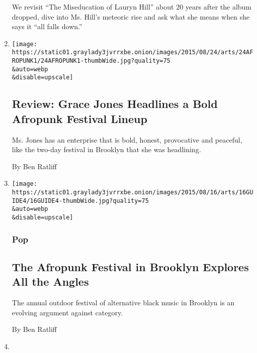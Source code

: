 \begin{enumerate}
  We revisit ``The Miseducation of Lauryn Hill'' about 20 years after
  the album dropped, dive into Ms. Hill's meteoric rise and ask what she
  means when she says it ``all falls down.''
\item
  \href{/2015/08/24/arts/music/review-grace-jones-headlines-a-bold-afropunk-festival-lineup.html}{}

  \texttt{[image: https://static01.graylady3jvrrxbe.onion/images/2015/08/24/arts/24AFROPUNK1/24AFROPUNK1-thumbWide.jpg?quality=75\\\&auto=webp\\\&disable=upscale]}

  \hypertarget{review-grace-jones-headlines-a-bold-afropunk-festival-lineup}{%
  \subsection{Review: Grace Jones Headlines a Bold Afropunk Festival
  Lineup}\label{review-grace-jones-headlines-a-bold-afropunk-festival-lineup}}

  Ms. Jones has an enterprise that is bold, honest, provocative and
  peaceful, like the two-day festival in Brooklyn that she was
  headlining.

  By Ben Ratliff
\item
  \href{/2015/08/16/arts/music/the-afropunk-festival-in-brooklyn-explores-all-the-angles.html}{}

  \texttt{[image: https://static01.graylady3jvrrxbe.onion/images/2015/08/16/arts/16GUIDE4/16GUIDE4-thumbWide.jpg?quality=75\\\&auto=webp\\\&disable=upscale]}

  \hypertarget{pop}{%
  \subsubsection{Pop}\label{pop}}

  \hypertarget{the-afropunk-festival-in-brooklyn-explores-all-the-angles}{%
  \subsection{The Afropunk Festival in Brooklyn Explores All the
  Angles}\label{the-afropunk-festival-in-brooklyn-explores-all-the-angles}}

  The annual outdoor festival of alternative black music in Brooklyn is
  an evolving argument against category.

  By Ben Ratliff
\item
  \href{https://takingnote.blogs.nytimes3xbfgragh.onion/2015/07/15/jeb-bushs-latest-attack-on-obama-makes-no-sense/}{}


\end{enumerate}

